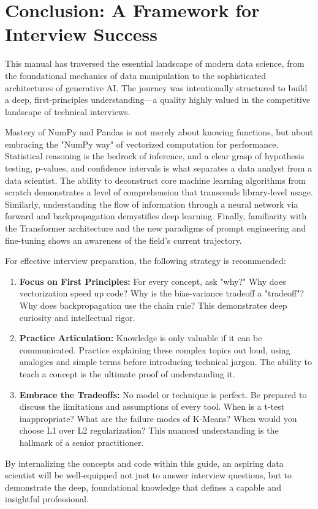 \documentclass[11pt,a4paper]{article}
\begin{document}
\section*{Conclusion: A Framework for Interview Success}

This manual has traversed the essential landscape of modern data science, from the foundational mechanics of data manipulation to the sophisticated architectures of generative AI. The journey was intentionally structured to build a deep, first-principles understanding—a quality highly valued in the competitive landscape of technical interviews.

Mastery of NumPy and Pandas is not merely about knowing functions, but about embracing the "NumPy way" of vectorized computation for performance. Statistical reasoning is the bedrock of inference, and a clear grasp of hypothesis testing, p-values, and confidence intervals is what separates a data analyst from a data scientist. The ability to deconstruct core machine learning algorithms from scratch demonstrates a level of comprehension that transcends library-level usage. Similarly, understanding the flow of information through a neural network via forward and backpropagation demystifies deep learning. Finally, familiarity with the Transformer architecture and the new paradigms of prompt engineering and fine-tuning shows an awareness of the field's current trajectory.

For effective interview preparation, the following strategy is recommended:
\begin{enumerate}
    \item \textbf{Focus on First Principles:} For every concept, ask "why?" Why does vectorization speed up code? Why is the bias-variance tradeoff a "tradeoff"? Why does backpropagation use the chain rule? This demonstrates deep curiosity and intellectual rigor.
    \item \textbf{Practice Articulation:} Knowledge is only valuable if it can be communicated. Practice explaining these complex topics out loud, using analogies and simple terms before introducing technical jargon. The ability to teach a concept is the ultimate proof of understanding it.
    \item \textbf{Embrace the Tradeoffs:} No model or technique is perfect. Be prepared to discuss the limitations and assumptions of every tool. When is a t-test inappropriate? What are the failure modes of K-Means? When would you choose L1 over L2 regularization? This nuanced understanding is the hallmark of a senior practitioner.
\end{enumerate}

By internalizing the concepts and code within this guide, an aspiring data scientist will be well-equipped not just to answer interview questions, but to demonstrate the deep, foundational knowledge that defines a capable and insightful professional.
\end{document}
